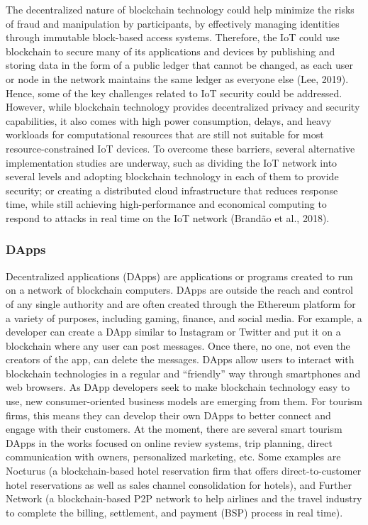 \documentclass[
  letterpaper,
  DIV=11,
  numbers=noendperiod]{scrreprt}
\begin{document}
The decentralized nature of blockchain technology could help minimize
the risks of fraud and manipulation by participants, by effectively
managing identities through immutable block-based access systems.
Therefore, the IoT could use blockchain to secure many of its
applications and devices by publishing and storing data in the form of a
public ledger that cannot be changed, as each user or node in the
network maintains the same ledger as everyone else (Lee, 2019). Hence,
some of the key challenges related to IoT security could be addressed.
However, while blockchain technology provides decentralized privacy and
security capabilities, it also comes with high power consumption,
delays, and heavy workloads for computational resources that are still
not suitable for most resource-constrained IoT devices. To overcome
these barriers, several alternative implementation studies are underway,
such as dividing the IoT network into several levels and adopting
blockchain technology in each of them to provide security; or creating a
distributed cloud infrastructure that reduces response time, while still
achieving high-performance and economical computing to respond to
attacks in real time on the IoT network (Brandão et al., 2018).

\hypertarget{dapps}{%
\subsubsection{DApps}\label{dapps}}

Decentralized applications (DApps) are applications or programs created
to run on a network of blockchain computers. DApps are outside the reach
and control of any single authority and are often created through the
Ethereum platform for a variety of purposes, including gaming, finance,
and social media. For example, a developer can create a DApp similar to
Instagram or Twitter and put it on a blockchain where any user can post
messages. Once there, no one, not even the creators of the app, can
delete the messages. DApps allow users to interact with blockchain
technologies in a regular and ``friendly'' way through smartphones and
web browsers. As DApp developers seek to make blockchain technology easy
to use, new consumer-oriented business models are emerging from them.
For tourism firms, this means they can develop their own DApps to better
connect and engage with their customers. At the moment, there are
several smart tourism DApps in the works focused on online review
systems, trip planning, direct communication with owners, personalized
marketing, etc. Some examples are Nocturus (a blockchain-based hotel
reservation firm that offers direct-to-customer hotel reservations as
well as sales channel consolidation for hotels), and Further Network (a
blockchain-based P2P network to help airlines and the travel industry to
complete the billing, settlement, and payment (BSP) process in real
time).
\end{document}
